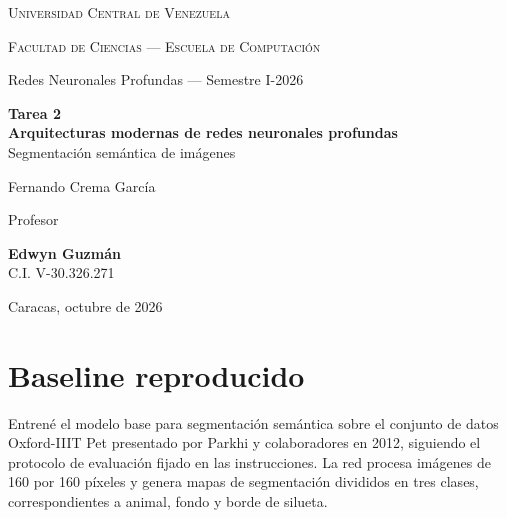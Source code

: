 \documentclass[10pt,letterpaper]{article}
\newcommand{\sangria}{\hspace*{1.5em}}
\begin{document}
\begin{titlepage}
    \centering
    \vspace*{1.2cm}

    {\scshape\Large Universidad Central de Venezuela\par}
    \vspace{0.25cm}
    {\scshape\large Facultad de Ciencias --- Escuela de Computación\par}
    \vspace{0.25cm}
    {\large Redes Neuronales Profundas --- Semestre I-2026\par}

    \vspace{2.4cm}

    {\huge\bfseries Tarea 2}\\[0.4cm]
    {\Large\bfseries Arquitecturas modernas de redes neuronales profundas}\\[0.35cm]
    {\large Segmentación semántica de imágenes}\par

    \vspace{2.2cm}

    {\large Fernando Crema García\par}
    \vspace{0.15cm}
    {\normalsize Profesor\par}

    \vspace{2.4cm}

    \begin{flushleft}
        \large
        \textbf{Edwyn Guzmán}\\
        C.I. V-30.326.271
    \end{flushleft}

    \vfill

    {\large Caracas, octubre de 2026\par}
    \vspace*{0.5cm}
\end{titlepage}

\newpage
\setcounter{page}{1}

\section{Baseline reproducido}

\sangria Entrené el modelo base para segmentación semántica sobre el conjunto de datos Oxford-IIIT Pet presentado por Parkhi y colaboradores en 2012, siguiendo el protocolo de evaluación fijado en las instrucciones. La red procesa imágenes de 160 por 160 píxeles y genera mapas de segmentación divididos en tres clases, correspondientes a animal, fondo y borde de silueta.
\end{document}
